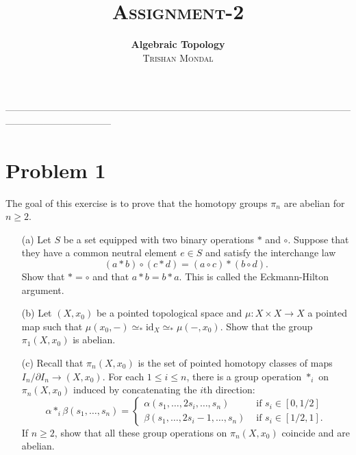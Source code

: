 \documentclass[11pt]{article}
\newcommand{\id}{\mathrm{id}}
\begin{document}
 
 \title{{\Huge \textsc{Assignment-2}}}
 \author{\textbf{ \textsf{Algebraic Topology}} \\[0.2cm]
 \large \textsc{Trishan Mondal}}
 \date{}
 \maketitle

 ---------------------------------------------------------------------------------------------------------------------------------------------

 \section{Problem 1}

 \begin{prob}{}{}
    The goal of this exercise is to prove that the homotopy groups $\pi_n$ are abelian for $n \geq 2$. 
\begin{enumerate}
    \item[(a)] Let $S$ be a set equipped with two binary operations $\ast$ and $\circ$. Suppose that they have a common neutral element $e \in S$ and satisfy the interchange law 
    \[
        (a \ast b) \circ (c \ast d) = (a \circ c) \ast (b \circ d).    
    \] 
    Show that $\ast = \circ$ and that $a \ast b = b \ast a$. This is called the Eckmann-Hilton argument. 
    \item[(b)] Let $(X,x_0)$ be a pointed topological space and $\mu : X \times X \to X$ a pointed map such that $\mu(x_0, -) \simeq_* \id_X \simeq_* \mu(-,x_0)$. Show that the group $\pi_1(X,x_0)$ is abelian. 
    \item[(c)] Recall that $\pi_n(X,x_0)$ is the set of pointed homotopy classes of maps $I_n/\partial I_n \to (X,x_0)$. For each $1 \leq i \leq n$, there is a group operation $\ast_i$ on $\pi_n(X,x_0)$ induced by concatenating the $i$th direction: 
    \[
        \alpha \ast_i \beta (s_1,\dots,s_n) = \begin{cases}
            \alpha(s_1,\dots,2s_i, \dots, s_n) & \mbox{ if } s_i \in [0,1/2] \\ 
            \beta(s_1,\dots,2s_i - 1, \dots, s_n) & \mbox{ if } s_i \in [1/2,1].
        \end{cases}    
    \]
    If $n \geq 2$, show that all these group operations on $\pi_n(X,x_0)$ coincide and are abelian.
\end{enumerate}
 \end{prob}
\end{document}

